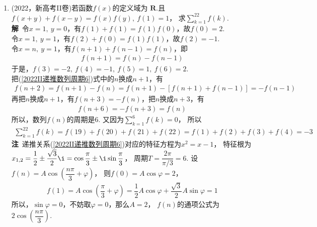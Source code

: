 \begin{enumerate}[label={【\textbf{例\thechapter.\arabic*}】},
 leftmargin=\inteval{\myenumleftmargin}pt,
 itemsep=\inteval{\myenumitempsep}pt,
 itemindent=\inteval{\myenumitemindent}pt]
如果把$ \e^x $换成$ a^x $，并不会影响$ f(x),g(x) $的奇偶性。\\
\textbf{注}$ ^* $ $ \dfrac{x}{\e^x-1} $为伯努利数$ B_n $的生成函数，
\begin{gather*}
    \dfrac{x}{\e^x-1}=\sum\limits_{n=0}^{\infty}B_n\dfrac{x^n}{n!} 
\end{gather*}
可参看《 特殊函数概论》\footnote{
    王竹溪，郭敦仁. 特殊函数概论[M].北京大学出版社, 2012.7，第1页。}。

$ g(x)+\dfrac{1}{2}=\dfrac{\e^x}{\e^x+1}\in (0,1) $被称为Sigmoid函数，
$ \dfrac{\e^x}{\e^x+1},\ \dfrac{x\e^x}{\e^x+1},\ \ln\left(\dfrac{\e^x}{\e^x+1}\right),
\\ \tanh(x)=\dfrac{\e^x-\e^{-x}}{\e^x+\e^{-x}},\ \dfrac{x}{1+|x|},\ 
\ln(\e^x+1) $都是人工神经网络中常用的函数，图像如下。
\begin{figure}[!htbp]
    \centering
    \texttt{[image: 人工智能函数]}
\end{figure} \\

\item (2022，新高考II卷)若函数$f(x)$的定义域为
$\mathbf{R}$.且$f(x+y)+f(x-y)=f(x)f(y),\ f(1)=1$，
求$\sum\limits_{k=1}^{22}f(k)$.\\
\textbf{解}\ 令$ x=1,\ y=0 $，有$ f(1)+f(1)=f(1)f(0) $，故$ f(0)=2 $. \\
令$ x=1,\ y=1 $，有$ f(2)+f(0)=f(1)f(1) $，故$ f(2)=-1 $. \\
令$ x=n,\ y=1 $，有$ f(n+1)+f(n-1)=f(n) $，即
\begin{gather}\label{2022II递推数列周期6}
    f(n+1)=f(n)-f(n-1)
\end{gather}
于是，$ f(3)=-2,\ f(4)=-1,\ f(5)=1,\ f(6)=2 $. \\
把(\ref{2022II递推数列周期6})式中的$ n $换成$ n+1 $，有
\begin{gather*}
    f(n+2)=f(n+1)-f(n)=f(n+1)-[f(n+1)+f(n-1)]=-f(n-1)
\end{gather*}
再把$ n $换成$ n+1 $，有$ f(n+3)=-f(n) $，把$ n $换成$ n+3 $，有
\begin{gather*}
    f(n+6)=-f(n+3)=f(n)
\end{gather*}
所以，数列$ f(n) $的周期是6. 又因为$ \sum\limits_{k=1}^{6}f(k)=0 $，
所以
\begin{gather*}
    \sum\limits_{k=1}^{22}f(k)=f(19)+f(20)+f(21)+f(22)=
    f(1)+f(2)+f(3)+f(4)=-3
\end{gather*}
\textbf{注}\ 递推关系(\ref{2022II递推数列周期6})对应的特征方程为$ x^2=x-1 $，
特征根为$ x_{1,2}=\dfrac{1}{2}\pm \dfrac{\sqrt{3}}{2}\i=
\cos\dfrac{\pi}{3}\pm \i\sin\dfrac{\pi}{3} $，
周期$ T=\dfrac{2\pi}{\pi/3}=6 $. 
设$ f(n)=A\cos\left(\dfrac{n\pi}{3}+\varphi\right) $，
则$ f(0)=A\cos\varphi=2 $，
\begin{gather*}
    f(1)=A\cos\left(\dfrac{\pi}{3}+\varphi\right)=
    \dfrac{1}{2}A\cos\varphi+\dfrac{\sqrt{3}}{2}A\sin\varphi=1
\end{gather*}
所以，$ \sin\varphi=0 $，不妨取$ \varphi=0 $，那么$ A=2 $，
$ f(n) $的通项公式为$ 2\cos\left(\dfrac{n\pi}{3}\right) $. 


\end{enumerate}
